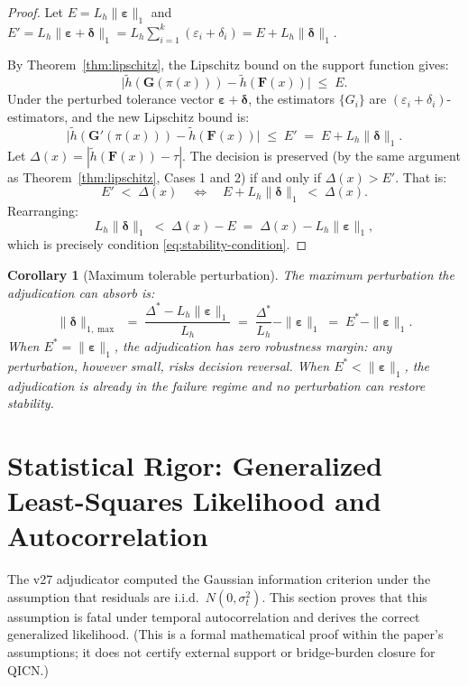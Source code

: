 \documentclass[11pt]{article}
\newtheorem{corollary}{Corollary}
\begin{document}
\begin{proof}
Let $E=L_h\|\boldsymbol{\varepsilon}\|_1$ and $E'=L_h\|\boldsymbol{\varepsilon}+\boldsymbol{\delta}\|_1=L_h\sum_{i=1}^k(\varepsilon_i+\delta_i)=E+L_h\|\boldsymbol{\delta}\|_1$.

By Theorem~\ref{thm:lipschitz}, the Lipschitz bound on the support function gives:
\[
\bigl|\tilde{h}(\mathbf{G}(\pi(x)))-\tilde{h}(\mathbf{F}(x))\bigr|\;\leq\;E.
\]
Under the perturbed tolerance vector $\boldsymbol{\varepsilon}+\boldsymbol{\delta}$, the estimators $\{G_i\}$ are $(\varepsilon_i+\delta_i)$-estimators, and the new Lipschitz bound is:
\[
\bigl|\tilde{h}(\mathbf{G}'(\pi(x)))-\tilde{h}(\mathbf{F}(x))\bigr|\;\leq\;E'\;=\;E+L_h\|\boldsymbol{\delta}\|_1.
\]
Let $\Delta(x)=|\tilde{h}(\mathbf{F}(x))-\tau|$. The decision is preserved (by the same argument as Theorem~\ref{thm:lipschitz}, Cases 1 and 2) if and only if $\Delta(x)>E'$. That is:
\[
E'\;<\;\Delta(x)\quad\Longleftrightarrow\quad E+L_h\|\boldsymbol{\delta}\|_1\;<\;\Delta(x).
\]
Rearranging:
\[
L_h\|\boldsymbol{\delta}\|_1\;<\;\Delta(x)-E\;=\;\Delta(x)-L_h\|\boldsymbol{\varepsilon}\|_1,
\]
which is precisely condition \eqref{eq:stability-condition}.
\end{proof}

\begin{corollary}[Maximum tolerable perturbation]\label{cor:max-perturbation}
The maximum perturbation the adjudication can absorb is:
\[
\|\boldsymbol{\delta}\|_{1,\max}\;=\;\frac{\Delta^{*}-L_h\|\boldsymbol{\varepsilon}\|_1}{L_h}\;=\;\frac{\Delta^{*}}{L_h}-\|\boldsymbol{\varepsilon}\|_1\;=\;E^{*}-\|\boldsymbol{\varepsilon}\|_1.
\]
When $E^{*}=\|\boldsymbol{\varepsilon}\|_1$, the adjudication has zero robustness margin: any perturbation, however small, risks decision reversal. When $E^{*}<\|\boldsymbol{\varepsilon}\|_1$, the adjudication is already in the failure regime and no perturbation can restore stability.
\end{corollary}

\section{Statistical Rigor: Generalized Least-Squares Likelihood and Autocorrelation}
\label{sec:gls}

The v27 adjudicator computed the Gaussian information criterion under the assumption that residuals are i.i.d.\ $N(0,\sigma_t^2)$. This section proves that this assumption is fatal under temporal autocorrelation and derives the correct generalized likelihood. (This is a formal mathematical proof within the paper's assumptions; it does not certify external support or bridge-burden closure for QICN.)
\end{document}

